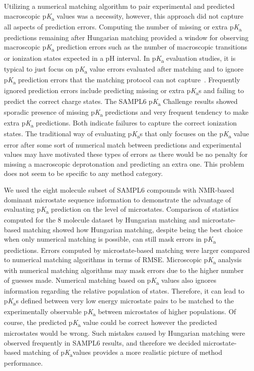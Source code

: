 \documentclass[9pt,lineno,final]{elife}
\newcommand{\pKa}{p\textit{K}\textsubscript{a}}
\begin{document}
Utilizing a numerical matching algorithm to pair experimental and predicted macroscopic \pKa{} values was a necessity, however, this approach did not capture all aspects of prediction errors. 
Computing the number of missing or extra \pKa{} predictions remaining after Hungarian matching provided a window for observing macroscopic \pKa{} prediction errors such as the number of macroscopic transitions or ionization states expected in a pH interval. 
In \pKa{} evaluation studies, it is typical to just focus on \pKa{} value errors evaluated after matching and to ignore \pKa{} prediction errors that the matching protocol can not capture~\citep{Balogh:2012:J.Pharm.Biomed.Anal.a, Settimo:2014:Pharm.Res.a, Meloun:2007:Anal.Bioanal.Chem., Liao:2009:J.Chem.Inf.Model., Manchester:2010:J.Chem.Inf.Model.}. 
Frequently ignored prediction errors include predicting missing or extra \pKa{}s and failing to predict the correct charge states. 
The SAMPL6 \pKa{} Challenge results showed sporadic presence of missing \pKa{} predictions and very frequent tendency to make extra \pKa{} predictions. 
Both indicate failures to capture the correct ionization states. 
The traditional way of evaluating \pKa{}s that only focuses on the \pKa{} value error after some sort of numerical match between predictions and experimental values may have motivated these types of errors as there would be no penalty for missing a macroscopic deprotonation and predicting an extra one. 
This problem does not seem to be specific to any method category.

We used the eight molecule subset of SAMPL6 compounds with NMR-based dominant microstate sequence information to demonstrate the advantage of evaluating \pKa{} prediction on the level of microstates.
Comparison of statistics computed for the 8 molecule dataset by Hungarian matching and microstate-based matching showed how Hungarian matching, despite being the best choice when only numerical matching is possible, can still mask errors in \pKa{} predictions. 
Errors computed by microstate-based matching were larger compared to numerical matching algorithms in terms of RMSE.
Microscopic \pKa{} analysis with numerical matching algorithms may mask errors due to the higher number of guesses made.
Numerical matching based on \pKa{} values also ignores information regarding the relative population of states. 
Therefore, it can lead to \pKa{}s defined between very low energy microstate pairs to be matched to the experimentally observable \pKa{} between microstates of higher populations. 
Of course, the predicted \pKa{} value could be correct however the predicted microstates would be wrong. 
Such mistakes caused by Hungarian matching were observed frequently in SAMPL6 results, and therefore we decided microstate-based matching of \pKa values provides a more realistic picture of method performance.  
\end{document}
